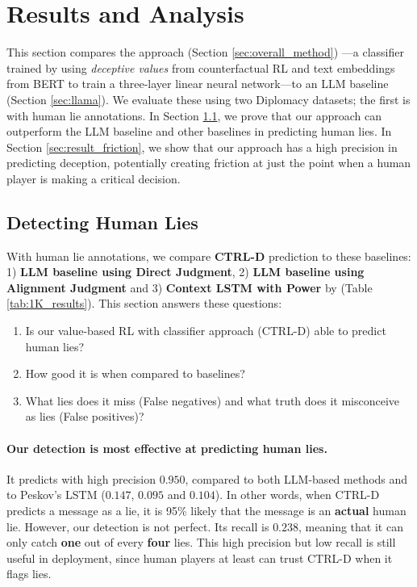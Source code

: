 \section{Results and Analysis}
\label{sec:results}

This section compares the approach (Section \ref{sec:overall_method}) ---a classifier trained by using \textit{deceptive values} from counterfactual RL and text embeddings from BERT to train a three-layer linear neural network---to an LLM baseline (Section \ref{sec:llama}). We evaluate these using two Diplomacy datasets; the first is \citet{peskov2020takes} with human lie annotations. 
In Section \ref{sec:result_lies}, we prove that our approach can outperform the LLM baseline and other baselines in predicting human lies. In Section \ref{sec:result_friction}, we show that our approach has a high precision in predicting deception, potentially creating friction at just the point when a human player is making a critical decision. 

\subsection{Detecting Human Lies}
\label{sec:result_lies}
With human lie annotations, we compare \textbf{CTRL-D} prediction to these baselines: 1) \textbf{LLM baseline using Direct Judgment}, 2) \textbf{LLM baseline using Alignment Judgment} and 3) \textbf{Context LSTM with Power} by \citet{peskov2020takes} (Table \ref{tab:1K_results}). This section answers these questions:
\begin{enumerate}
    \item Is our value-based RL with classifier approach (CTRL-D) able to predict human lies? 
    \item How good it is when compared to baselines?
    \item What lies does it miss (False negatives) and what truth does it misconceive as lies (False positives)?
\end{enumerate}

\paragraph{Our detection is most effective at predicting human lies.} It predicts with high precision \(0.950\), compared to both LLM-based methods and to Peskov's LSTM (\(0.147\), \(0.095\) and \(0.104\)). In other words, when CTRL-D predicts a message as a lie, it is 95\% likely that the message is an \textbf{actual} human lie. However, our detection is not perfect. Its recall is \(0.238\), meaning that it can only catch \textbf{one} out of every \textbf{four} lies. This high precision but low recall is still useful in deployment, since human players at least can trust CTRL-D when it flags lies.

